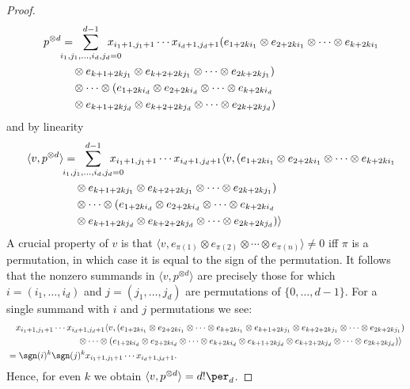 \begin{proof}
{
\fontsize{10}{12}
\selectfont
\begin{align*}
\quad p^{\otimes d} &=\hspace{-.5cm}\sum_{i_1,j_1,\ldots,i_d,j_d=0}^{d-1}\hspace{-.5cm} x_{i_1+1,j_1+1} \cdots x_{i_d+1,j_d+1}
(e_{1+2ki_1} \otimes e_{2+2ki_1} \otimes \cdots \otimes e_{k+2ki_1}\\ &\quad{}\otimes e_{k+1+2kj_1} \otimes e_{k+2+2kj_1} \otimes \cdots \otimes e_{2k+2kj_1})\\ &\quad\otimes \cdots \otimes
(e_{1+2ki_d} \otimes e_{2+2ki_d} \otimes \cdots \otimes e_{k+2ki_d}\\ &\quad{}\otimes e_{k+1+2kj_d} \otimes e_{k+2+2kj_d} \otimes \cdots \otimes e_{2k+2kj_d})
\end{align*}
}
and by linearity
{
\fontsize{10}{12}
\selectfont
\begin{align*}
\quad \langle v,p^{\otimes d}\rangle &= \hspace{-.5cm}\sum_{i_1,j_1,\ldots,i_d,j_d=0}^{d-1}\hspace{-.5cm} x_{i_1+1,j_1+1} \cdots x_{i_d+1,j_d+1}
\langle v,(e_{1+2ki_1} \otimes e_{2+2ki_1} \otimes \cdots \otimes e_{k+2ki_1}\\ &\quad{}\otimes e_{k+1+2kj_1} \otimes e_{k+2+2kj_1} \otimes \cdots \otimes e_{2k+2kj_1})\\ &\quad\otimes \cdots \otimes
(e_{1+2ki_d} \otimes e_{2+2ki_d} \otimes \cdots \otimes e_{k+2ki_d}\\ &\quad{}\otimes e_{k+1+2kj_d} \otimes e_{k+2+2kj_d} \otimes \cdots \otimes e_{2k+2kj_d})\rangle
\end{align*}
}
A crucial property of $v$ is that $\langle v,e_{\pi(1)} \otimes e_{\pi(2)} \otimes \cdots \otimes e_{\pi(n)}\rangle \neq 0$ iff $\pi$ is a permutation, in which case it is equal to the sign of the permutation.
It follows that the nonzero summands in $\langle v,p^{\otimes d}\rangle$ are precisely those for which~$i=(i_1,\ldots,i_d)$ and $j=(j_1,\ldots,j_d)$ are permutations of $\{0,\ldots,d-1\}$.
For a single summand with $i$ and $j$ permutations we see:
\begin{align*}
&\quad x_{i_1+1,j_1+1} \cdots x_{i_d+1,j_d+1}
\langle v,(e_{1+2ki_1} \otimes e_{2+2ki_1} \otimes \cdots \otimes e_{k+2ki_1} \otimes e_{k+1+2kj_1} \otimes e_{k+2+2kj_1} \otimes \cdots \otimes e_{2k+2kj_1})\\ &\quad\quad\quad\quad\quad\quad\quad\quad\otimes \cdots \otimes
(e_{1+2ki_d} \otimes e_{2+2ki_d} \otimes \cdots \otimes e_{k+2ki_d} \otimes e_{k+1+2kj_d} \otimes e_{k+2+2kj_d} \otimes \cdots \otimes e_{2k+2kj_d})\rangle
\\&= \sgn(i)^k \sgn(j)^k x_{i_1+1,j_1+1} \cdots x_{i_d+1,j_d+1}.
\end{align*}
Hence, for even $k$ we obtain $\langle v,p^{\otimes d}\rangle = d! \per_d$.
\end{proof}


